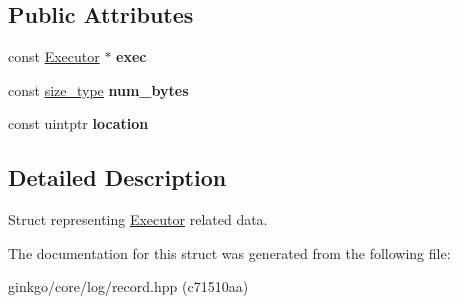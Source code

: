 \subsection*{Public Attributes}
\begin{DoxyCompactItemize}
\item 
\mbox{\label{structgko_1_1log_1_1executor__data_af2abfc8622da8be8466de15db9c15f82}} 
const \hyperlink{classgko_1_1Executor}{Executor} $\ast$ {\bfseries exec}
\item 
\mbox{\label{structgko_1_1log_1_1executor__data_ae163391b85c824367dd0c7e4771ac8c9}} 
const \hyperlink{namespacegko_a6e5c95df0ae4e47aab2f604a22d98ee7}{size\+\_\+type} {\bfseries num\+\_\+bytes}
\item 
\mbox{\label{structgko_1_1log_1_1executor__data_a5ff784e87bb40d732118a9bd77457ebe}} 
const uintptr {\bfseries location}
\end{DoxyCompactItemize}


\subsection{Detailed Description}
Struct representing \hyperlink{classgko_1_1Executor}{Executor} related data. 

The documentation for this struct was generated from the following file\+:\begin{DoxyCompactItemize}
\item 
ginkgo/core/log/record.\+hpp (c71510aa)\end{DoxyCompactItemize}
